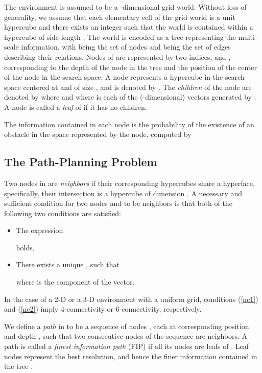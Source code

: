 \documentclass[letterpaper, 10 pt, conference]{ieeeconf}
\theoremstyle{definition}
\begin{document}
The environment  is assumed to be a -dimensional grid world.
Without loss of generality, we assume that each elementary cell of the grid world is a unit hypercube and there exists an integer  such that the world is contained within a hypercube of side length .
The world  is encoded  as a tree  representing the multi-scale information, with  being the set of nodes and  being the set of edges describing their relations.
Nodes of  are represented by two indices,  and , corresponding to the depth of the node  in the tree and the position of the center of the node in the search space.
A node  represents a hypercube in the search space  centered at  and of size , and is denoted by .
The \textit{children} of the node  are denoted by  where  and where  is each of the  (-dimensional) vectors generated by .
A node is called a \textit{leaf} of  if it has no children.

The information  contained in each node  is the probability of the existence of an obstacle in the space represented by the node, computed by


\subsection{The Path-Planning Problem}

Two nodes in  are \textit{neighbors}  if their corresponding hypercubes share a hyperface, specifically, their
intersection is a hypercube of dimension . A necessary and sufficient condition for two  nodes  and  to be neighbors is that both of the following two conditions are satisfied:

\begin{itemize}
\item The expression

holds,
\item
There exists a unique , such that

where  is the  component of the vector.
\end{itemize}

In the case of a 2-D or a 3-D environment with a uniform grid, conditions (\ref{nc1}) and (\ref{nc2}) imply 4-connectivity or 6-connectivity, respectively.

We define a \textit{path}  in  to be a sequence of nodes , each at corresponding  position  and depth , such that two consecutive nodes of the sequence are neighbors.
A path is called a \textit{finest information path} (FIP) if all its nodes are leafs of .
Leaf nodes represent the best resolution, and hence the finer information contained in the tree .
\end{document}
